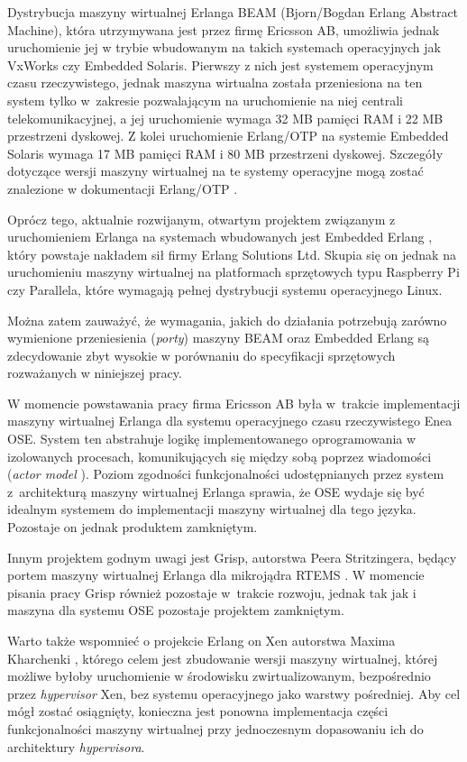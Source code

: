 Dystrybucja maszyny wirtualnej Erlanga BEAM (Bjorn/Bogdan Erlang Abstract Machine), która utrzymywana jest przez firmę Ericsson AB, umożliwia jednak uruchomienie jej w trybie wbudowanym na takich systemach operacyjnych jak VxWorks czy Embedded Solaris. Pierwszy z nich jest systemem operacyjnym czasu rzeczywistego, jednak maszyna wirtualna została przeniesiona na ten system tylko w~zakresie pozwalającym na uruchomienie na niej centrali telekomunikacyjnej, a jej uruchomienie wymaga 32 MB pamięci RAM i 22 MB przestrzeni dyskowej.
Z kolei uruchomienie Erlang/OTP na systemie Embedded Solaris wymaga 17 MB pamięci RAM i 80 MB przestrzeni dyskowej.
Szczegóły dotyczące wersji maszyny wirtualnej na te systemy operacyjne mogą zostać znalezione w dokumentacji Erlang/OTP \cite{ErlangVxWorks}.


Oprócz tego, aktualnie rozwijanym, otwartym projektem związanym z uruchomieniem Erlanga na systemach wbudowanych jest Embedded Erlang \cite{ErlangEmbedded}, który powstaje nakładem sił firmy Erlang Solutions Ltd. Skupia się on jednak na uruchomieniu maszyny wirtualnej na platformach sprzętowych typu Raspberry Pi czy Parallela, które wymagają pełnej dystrybucji systemu operacyjnego Linux.


Można zatem zauważyć, że wymagania, jakich do działania potrzebują zarówno wymienione przeniesienia (\emph{porty}) maszyny BEAM oraz Embedded Erlang są zdecydowanie zbyt wysokie w porównaniu do specyfikacji sprzętowych rozważanych w niniejszej pracy.


W momencie powstawania pracy firma Ericsson AB była w~trakcie implementacji maszyny wirtualnej Erlanga dla systemu operacyjnego czasu rzeczywistego Enea OSE. System ten abstrahuje logikę implementowanego oprogramowania w izolowanych procesach, komunikujących się między sobą poprzez wiadomości (\emph{actor model} \cite{Hewitt73}). Poziom zgodności funkcjonalności udostępnianych przez system z~architekturą maszyny wirtualnej Erlanga sprawia, że OSE wydaje się być idealnym systemem do implementacji maszyny wirtualnej dla tego języka. Pozostaje on jednak produktem zamkniętym.

Innym projektem godnym uwagi jest Grisp, autorstwa Peera Stritzingera, będący portem maszyny wirtualnej Erlanga dla mikrojądra RTEMS \cite{Stritzinger2013}. W momencie pisania pracy Grisp również pozostaje w~trakcie rozwoju, jednak tak jak i maszyna dla systemu OSE pozostaje projektem zamkniętym.

Warto także wspomnieć o projekcie Erlang on Xen autorstwa Maxima Kharchenki \cite{Kharchenko2012}, którego celem jest zbudowanie wersji maszyny wirtualnej, której możliwe byłoby uruchomienie w środowisku zwirtualizowanym, bezpośrednio przez \emph{hypervisor} Xen, bez systemu operacyjnego jako warstwy pośredniej. Aby cel mógł zostać osiągnięty, konieczna jest ponowna implementacja części funkcjonalności maszyny wirtualnej przy jednoczesnym dopasowaniu ich do architektury \emph{hypervisora}.

